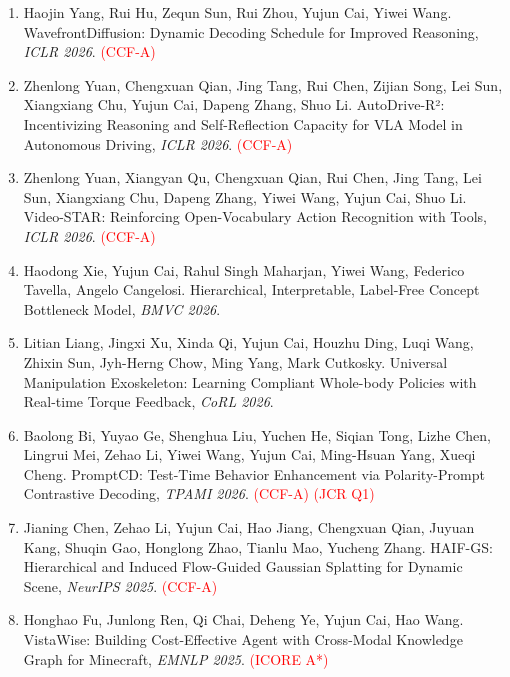 \begin{enumerate}
\item Haojin Yang, Rui Hu, Zequn Sun, Rui Zhou, Yujun Cai, Yiwei Wang. WavefrontDiffusion: Dynamic Decoding Schedule for Improved Reasoning, \textit{ICLR 2026}. \textcolor{red}{(CCF-A)}

\item Zhenlong Yuan, Chengxuan Qian, Jing Tang, Rui Chen, Zijian Song, Lei Sun, Xiangxiang Chu, Yujun Cai, Dapeng Zhang, Shuo Li. AutoDrive-R²: Incentivizing Reasoning and Self-Reflection Capacity for VLA Model in Autonomous Driving, \textit{ICLR 2026}. \textcolor{red}{(CCF-A)}

\item Zhenlong Yuan, Xiangyan Qu, Chengxuan Qian, Rui Chen, Jing Tang, Lei Sun, Xiangxiang Chu, Dapeng Zhang, Yiwei Wang, Yujun Cai, Shuo Li. Video-STAR: Reinforcing Open-Vocabulary Action Recognition with Tools, \textit{ICLR 2026}. \textcolor{red}{(CCF-A)}

\item Haodong Xie, Yujun Cai, Rahul Singh Maharjan, Yiwei Wang, Federico Tavella, Angelo Cangelosi. Hierarchical, Interpretable, Label-Free Concept Bottleneck Model, \textit{BMVC 2026}.

\item Litian Liang, Jingxi Xu, Xinda Qi, Yujun Cai, Houzhu Ding, Luqi Wang, Zhixin Sun, Jyh-Herng Chow, Ming Yang, Mark Cutkosky. Universal Manipulation Exoskeleton: Learning Compliant Whole-body Policies with Real-time Torque Feedback, \textit{CoRL 2026}.

\item Baolong Bi, Yuyao Ge, Shenghua Liu, Yuchen He, Siqian Tong, Lizhe Chen, Lingrui Mei, Zehao Li, Yiwei Wang, Yujun Cai, Ming-Hsuan Yang, Xueqi Cheng. PromptCD: Test-Time Behavior Enhancement via Polarity-Prompt Contrastive Decoding, \textit{TPAMI 2026}. \textcolor{red}{(CCF-A)} \textcolor{red}{(JCR Q1)}

\item Jianing Chen, Zehao Li, Yujun Cai, Hao Jiang, Chengxuan Qian, Juyuan Kang, Shuqin Gao, Honglong Zhao, Tianlu Mao, Yucheng Zhang. HAIF-GS: Hierarchical and Induced Flow-Guided Gaussian Splatting for Dynamic Scene, \textit{NeurIPS 2025}. \textcolor{red}{(CCF-A)}

\item Honghao Fu, Junlong Ren, Qi Chai, Deheng Ye, Yujun Cai, Hao Wang. VistaWise: Building Cost-Effective Agent with Cross-Modal Knowledge Graph for Minecraft, \textit{EMNLP 2025}. \textcolor{red}{(ICORE A*)}


\end{enumerate}
